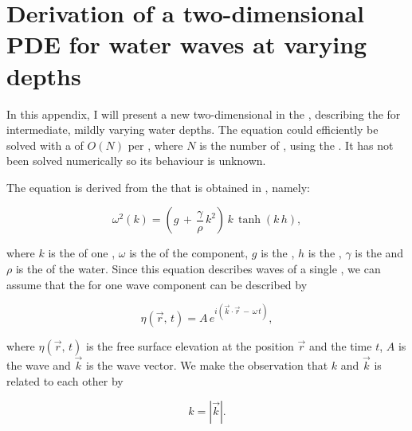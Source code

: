 \chapter{Derivation of a two-dimensional PDE for water waves at varying depths}

In this appendix, I will present a new two-dimensional \PDE in the , describing the  for intermediate, mildly varying water depths. The equation could efficiently be solved with a  of $O(N)$ per , where $N$ is the number of , using the \CFMM \citep{White1994}. It has not been solved numerically so its behaviour is unknown.

The equation is derived from the  that is obtained in , namely:

\begin{equation} \label{eq:dispersion}
\omega^2(k) = \left(g\,+\,\frac{\gamma}{\rho}\,k^2\right)\,k\,\tanh(k\,h),
\end{equation}

where $k$ is the  of one , $\omega$ is the  of the component, $g$ is the , $h$ is the , $\gamma$ is the  and $\rho$ is the  of the water. Since this equation describes waves of a single , we can assume that the  for one wave component can be described by

\begin{equation} \label{eq:component}
\eta(\vec{r},\,t) = A\,e^{i(\vec{k}\cdot\vec{r}\,-\,\omega\,t)},
\end{equation}

where $\eta(\vec{r},\,t)$ is the free surface elevation at the position $\vec{r}$ and the time $t$, $A$ is the wave  and $\vec{k}$ is the wave vector. We make the observation that $k$ and $\vec{k}$ is related to each other by

\begin{equation} \label{eq:kvectok}
k = \left|\vec{k}\right|.
\end{equation}

